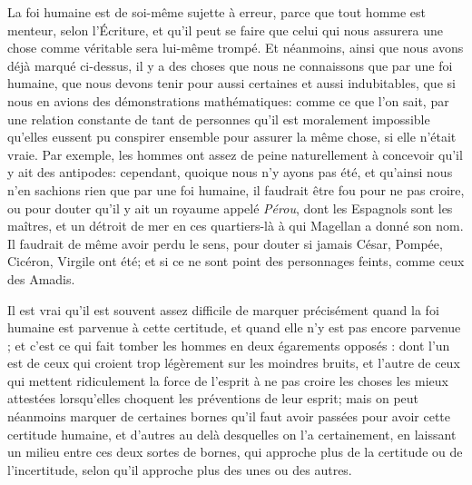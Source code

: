 La foi humaine est de soi-même sujette à erreur, parce que tout homme est menteur, selon l'Écriture, et qu'il peut se faire que celui qui nous assurera une chose comme véritable sera lui-même trompé. Et néanmoins, ainsi que nous avons déjà marqué ci-dessus, il y a des choses que nous ne connaissons que par une foi humaine, que nous devons tenir pour aussi certaines et aussi indubitables, que si nous en avions des démonstrations mathématiques: comme ce que l'on sait, par une relation constante de tant de personnes qu'il est moralement impossible qu'elles eussent pu conspirer ensemble pour assurer la même chose, si elle n'était vraie. Par exemple, les hommes ont assez de peine naturellement à concevoir qu'il y ait des antipodes: cependant, quoique nous n'y ayons pas été, et qu'ainsi nous n'en sachions rien que par une foi humaine, il faudrait être fou pour ne pas croire, ou pour douter qu'il y ait un royaume appelé \emph{Pérou}, dont les Espagnols sont les maîtres, et un détroit de mer en ces quartiers-là à qui Magellan a donné son nom. Il faudrait de même avoir perdu le sens, pour douter si jamais César, Pompée, Cicéron, Virgile ont été; et si ce ne sont point des personnages feints, comme ceux des Amadis.

Il est vrai qu'il est souvent assez difficile de marquer précisément quand la foi humaine est parvenue à cette certitude, et quand elle n'y est pas encore parvenue ; et c'est ce qui fait tomber les hommes en deux égarements opposés : dont l'un est de ceux qui croient trop légèrement sur les moindres bruits, et l'autre de ceux qui mettent ridiculement la force de l'esprit à ne pas croire les choses les mieux attestées lorsqu'elles choquent les préventions de leur esprit; mais on peut néanmoins marquer de certaines bornes qu'il faut avoir passées pour avoir cette certitude humaine, et d'autres au delà desquelles on l'a certainement, en laissant un milieu entre ces deux sortes de bornes, qui approche plus de la certitude ou de l'incertitude, selon qu'il approche plus des unes ou des autres.

